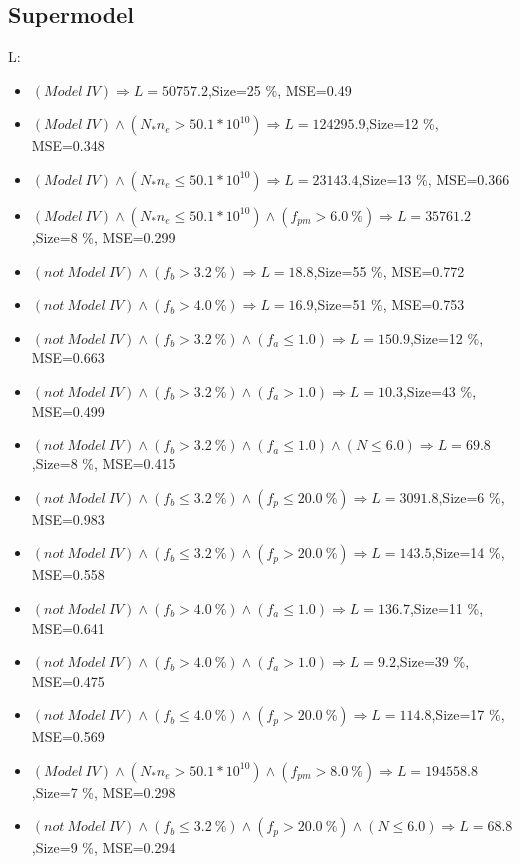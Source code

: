 \documentclass[numbered]{CSL}
\begin{document}
\subsection{Supermodel}
L:
\begin{itemize}
\item $(Model~IV) \Rightarrow L = 50757.2$,\hfill Size=25 \%, MSE=0.49
\item $(Model~IV) \land (N_* n_e > 50.1 * 10^{10}) \Rightarrow L = 124295.9$,\hfill Size=12 \%, MSE=0.348
\item $(Model~IV) \land (N_* n_e \leq 50.1 * 10^{10}) \Rightarrow L = 23143.4$,\hfill Size=13 \%, MSE=0.366
\item $(Model~IV) \land (N_* n_e \leq 50.1 * 10^{10}) \land (f_{pm} > 6.0~\%) \Rightarrow L = 35761.2$,\hfill Size=8 \%, MSE=0.299
\item $(not~Model~IV) \land (f_b > 3.2~\%) \Rightarrow L = 18.8$,\hfill Size=55 \%, MSE=0.772
\item $(not~Model~IV) \land (f_b > 4.0~\%) \Rightarrow L = 16.9$,\hfill Size=51 \%, MSE=0.753
\item $(not~Model~IV) \land (f_b > 3.2~\%) \land (f_a \leq 1.0) \Rightarrow L = 150.9$,\hfill Size=12 \%, MSE=0.663
\item $(not~Model~IV) \land (f_b > 3.2~\%) \land (f_a > 1.0) \Rightarrow L = 10.3$,\hfill Size=43 \%, MSE=0.499
\item $(not~Model~IV) \land (f_b > 3.2~\%) \land (f_a \leq 1.0) \land (N \leq 6.0) \Rightarrow L = 69.8$,\hfill Size=8 \%, MSE=0.415
\item $(not~Model~IV) \land (f_b \leq 3.2~\%) \land (f_p \leq 20.0~\%) \Rightarrow L = 3091.8$,\hfill Size=6 \%, MSE=0.983
\item $(not~Model~IV) \land (f_b \leq 3.2~\%) \land (f_p > 20.0~\%) \Rightarrow L = 143.5$,\hfill Size=14 \%, MSE=0.558
\item $(not~Model~IV) \land (f_b > 4.0~\%) \land (f_a \leq 1.0) \Rightarrow L = 136.7$,\hfill Size=11 \%, MSE=0.641
\item $(not~Model~IV) \land (f_b > 4.0~\%) \land (f_a > 1.0) \Rightarrow L = 9.2$,\hfill Size=39 \%, MSE=0.475
\item $(not~Model~IV) \land (f_b \leq 4.0~\%) \land (f_p > 20.0~\%) \Rightarrow L = 114.8$,\hfill Size=17 \%, MSE=0.569
\item $(Model~IV) \land (N_* n_e > 50.1 * 10^{10}) \land (f_{pm} > 8.0~\%) \Rightarrow L = 194558.8$,\hfill Size=7 \%, MSE=0.298
\item $(not~Model~IV) \land (f_b \leq 3.2~\%) \land (f_p > 20.0~\%) \land (N \leq 6.0) \Rightarrow L = 68.8$,\hfill Size=9 \%, MSE=0.294

\end{itemize}
\end{document}
